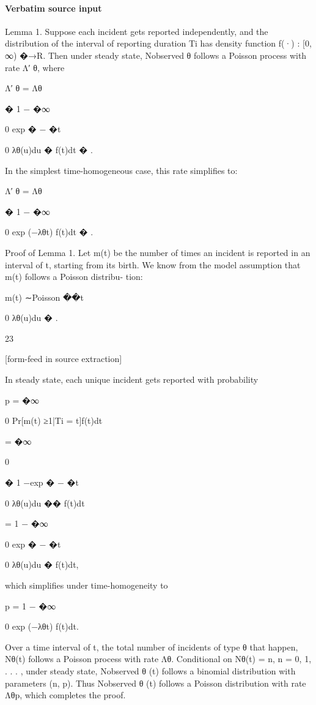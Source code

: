 \documentclass[10pt]{article}
\begin{document}
\paragraph{Verbatim source input}
\begin{ReviewVerbatim}
Lemma 1. Suppose each incident gets reported independently, and the distribution of the interval
of reporting duration Ti has density function f(·) : [0, ∞) �→R. Then under steady state, Nobserved
θ
follows a Poisson process with rate Λ′
θ, where

Λ′
θ = Λθ

�
1 −
�∞

0
exp
�
−
�t

0
λθ(u)du
�
f(t)dt
�
.

In the simplest time-homogeneous case, this rate simplifies to:

Λ′
θ = Λθ

�
1 −
�∞

0
exp (−λθt) f(t)dt
�
.

Proof of Lemma 1. Let m(t) be the number of times an incident is reported in an interval of t,
starting from its birth. We know from the model assumption that m(t) follows a Poisson distribu-
tion:

m(t) ∼Poisson
��t

0
λθ(u)du
�
.

23


[form-feed in source extraction]

In steady state, each unique incident gets reported with probability

p =
�∞

0
Pr[m(t) ≥1|Ti = t]f(t)dt

=
�∞

0

�
1 −exp
�
−
�t

0
λθ(u)du
��
f(t)dt

= 1 −
�∞

0
exp
�
−
�t

0
λθ(u)du
�
f(t)dt,

which simplifies under time-homogeneity to

p = 1 −
�∞

0
exp (−λθt) f(t)dt.

Over a time interval of t, the total number of incidents of type θ that happen, Nθ(t) follows
a Poisson process with rate Λθ.
Conditional on Nθ(t) = n, n = 0, 1, . . . , under steady state,
Nobserved
θ
(t) follows a binomial distribution with parameters (n, p).
Thus Nobserved
θ
(t) follows a
Poisson distribution with rate Λθp, which completes the proof.
\end{ReviewVerbatim}
\end{document}
